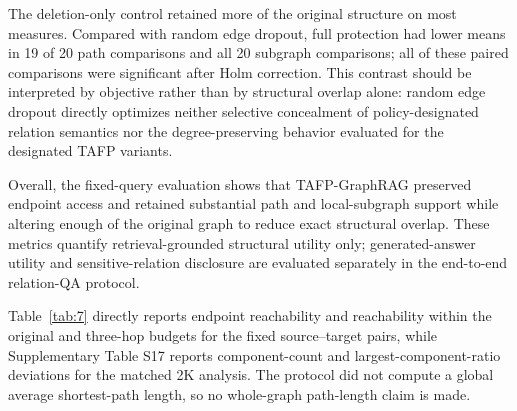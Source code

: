 \documentclass[preprint,12pt]{elsarticle}
\begin{document}
The deletion-only control retained more of the original structure on most measures. Compared with random edge dropout, full protection had lower means in 19 of 20 path comparisons and all 20 subgraph comparisons; all of these paired comparisons were significant after Holm correction. This contrast should be interpreted by objective rather than by structural overlap alone: random edge dropout directly optimizes neither selective concealment of policy-designated relation semantics nor the degree-preserving behavior evaluated for the designated TAFP variants.

Overall, the fixed-query evaluation shows that TAFP-GraphRAG preserved endpoint access and retained substantial path and local-subgraph support while altering enough of the original graph to reduce exact structural overlap. These metrics quantify retrieval-grounded structural utility only; generated-answer utility and sensitive-relation disclosure are evaluated separately in the end-to-end relation-QA protocol.

Table~\ref{tab:7} directly reports endpoint reachability and reachability within the original and three-hop budgets for the fixed source--target pairs, while Supplementary Table S17 reports component-count and largest-component-ratio deviations for the matched 2K analysis. The protocol did not compute a global average shortest-path length, so no whole-graph path-length claim is made.
\end{document}
